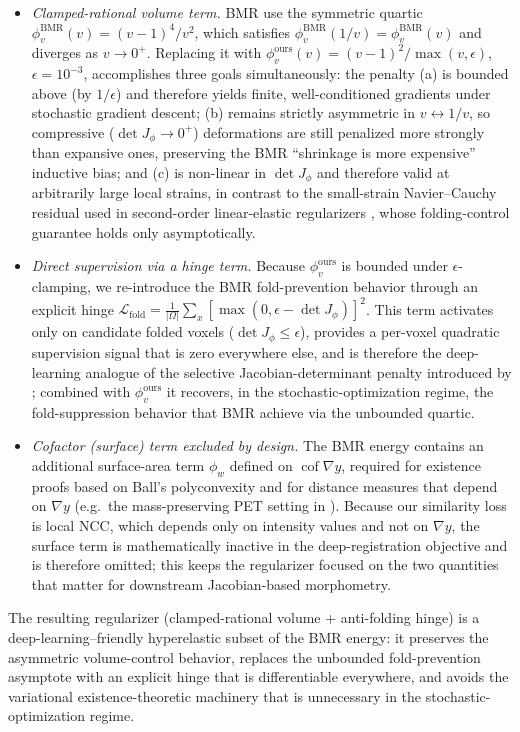 \documentclass[jimaging,article,submit,pdftex,moreauthors]{Definitions/mdpi}
\begin{document}
\begin{itemize}\setlength\itemsep{2pt}
\item \emph{Clamped-rational volume term.} BMR use the symmetric quartic $\phi^{\mathrm{BMR}}_v(v)=(v-1)^4/v^2$, which satisfies $\phi^{\mathrm{BMR}}_v(1/v)=\phi^{\mathrm{BMR}}_v(v)$ and diverges as $v\to 0^+$. Replacing it with $\phi^{\mathrm{ours}}_v(v)=(v-1)^2/\max(v,\epsilon)$, $\epsilon=10^{-3}$, accomplishes three goals simultaneously: the penalty (a) is bounded above (by $1/\epsilon$) and therefore yields finite, well-conditioned gradients under stochastic gradient descent; (b) remains strictly asymmetric in $v\leftrightarrow 1/v$, so compressive ($\det J_\phi\to 0^+$) deformations are still penalized more strongly than expansive ones, preserving the BMR ``shrinkage is more expensive'' inductive bias; and (c) is non-linear in $\det J_\phi$ and therefore valid at arbitrarily large local strains, in contrast to the small-strain Navier--Cauchy residual used in second-order linear-elastic regularizers \cite{elasticmorph2025}, whose folding-control guarantee holds only asymptotically.
\item \emph{Direct supervision via a hinge term.} Because $\phi^{\mathrm{ours}}_v$ is bounded under $\epsilon$-clamping, we re-introduce the BMR fold-prevention behavior through an explicit hinge $\mathcal{L}_{\mathrm{fold}}=\frac{1}{|\Omega|}\sum_x[\max(0,\epsilon-\det J_\phi)]^2$. This term activates only on candidate folded voxels ($\det J_\phi\le\epsilon$), provides a per-voxel quadratic supervision signal that is zero everywhere else, and is therefore the deep-learning analogue of the selective Jacobian-determinant penalty introduced by \citet{mok2020fast}; combined with $\phi^{\mathrm{ours}}_v$ it recovers, in the stochastic-optimization regime, the fold-suppression behavior that BMR achieve via the unbounded quartic.
\item \emph{Cofactor (surface) term excluded by design.} The BMR energy contains an additional surface-area term $\phi_w$ defined on $\operatorname{cof}\nabla y$, required for existence proofs based on Ball's polyconvexity and for distance measures that depend on $\nabla y$ (e.g.\ the mass-preserving PET setting in \citet{burger2013hyperelastic}). Because our similarity loss is local NCC, which depends only on intensity values and not on $\nabla y$, the surface term is mathematically inactive in the deep-registration objective and is therefore omitted; this keeps the regularizer focused on the two quantities that matter for downstream Jacobian-based morphometry.
\end{itemize}
The resulting regularizer (clamped-rational volume + anti-folding hinge) is a deep-learning--friendly hyperelastic subset of the BMR energy: it preserves the asymmetric volume-control behavior, replaces the unbounded fold-prevention asymptote with an explicit hinge that is differentiable everywhere, and avoids the variational existence-theoretic machinery that is unnecessary in the stochastic-optimization regime.
\end{document}

